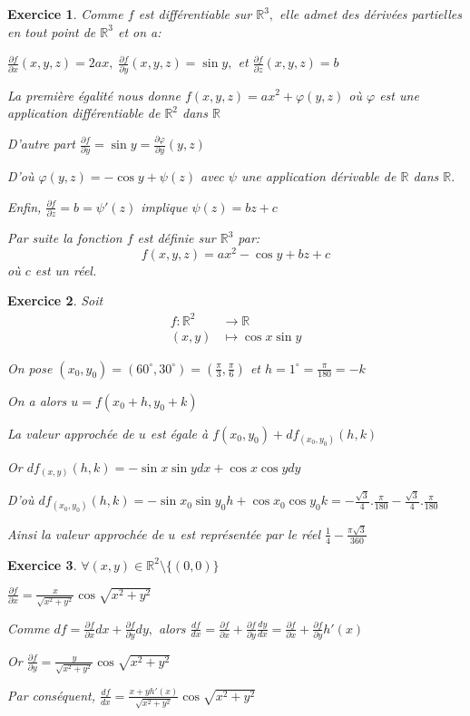 \documentclass[11pt,a4paper]{report}
\newtheorem{exo}{Exercice}[section]
\begin{document}
\begin{exo}
Comme $f$ est différentiable sur $\mathbb{R}^3,$ elle admet des dérivées partielles en tout point de $\mathbb{R}^3$ et on a:

$\frac{\partial f}{\partial x}(x,y,z)=2ax,\;\frac{\partial f}{\partial y}(x,y,z)=\sin y,$ et $\frac{\partial f}{\partial z}(x,y,z)=b$

La première égalité nous donne $f(x,y,z)=ax^2+\varphi(y,z)$ où $\varphi$ est une application différentiable de $\mathbb{R}^2$ dans $\mathbb{R}$

D'autre part $\frac{\partial f}{\partial y}=\sin y=\frac{\partial \varphi}{\partial y}(y,z)$

D'où $\varphi(y,z)=-\cos y+\psi(z)$ avec $\psi$ une application dérivable de $\mathbb{R}$ dans $\mathbb{R}.$

Enfin, $\frac{\partial f}{\partial z}=b=\psi'(z)$ implique $\psi(z)=bz+c$

Par suite la fonction $f$ est définie sur $\mathbb{R}^3$ par:
$$f(x,y,z)=ax^2-\cos y+bz+c$$ où $c$ est un réel.
\end{exo}
\begin{exo}
Soit
\begin{align*}
f:\mathbb{R}^2 &\rightarrow \mathbb{R}\\
(x,y)&\mapsto \cos x\sin y
\end{align*}

On pose $(x_0,y_0)=(60^{\circ},30^{\circ})=(\frac{\pi}{3},\frac{\pi}{6})$ et $h=1^{\circ}=\frac{\pi}{180}=-k$

On a alors $u=f(x_0+h,y_0+k)$

La valeur approchée de $u$ est égale à $f(x_0,y_0)+df_{(x_0,y_0)}(h,k)$

Or $df_{(x,y)}(h,k)=-\sin x\sin y dx+\cos x\cos y dy$

D'où $df_{(x_0,y_0)}(h,k)=-\sin x_0\sin y_0 h+\cos x_0\cos y_0 k=-\frac{\sqrt{3}}{4}.\frac{\pi}{180}-\frac{\sqrt{3}}{4}.\frac{\pi}{180}$

Ainsi la valeur approchée de $u$ est représentée par le réel $\frac{1}{4}-\frac{\pi\sqrt{3}}{360}$
\end{exo}
\begin{exo}
$\forall(x,y)\in\mathbb{R}^2\setminus\{(0,0)\}$

$\frac{\partial f}{\partial x}=\frac{x}{\sqrt{x^2+y^2}}\cos\sqrt{x^2+y^2}$

Comme $df=\frac{\partial f}{\partial x}dx+\frac{\partial f}{\partial y}dy,$ alors $\frac{df}{dx}=\frac{\partial f}{\partial x}+\frac{\partial f}{\partial y}\frac{dy}{dx}=\frac{\partial f}{\partial x}+\frac{\partial f}{\partial y}h'(x)$

Or $\frac{\partial f}{\partial y}=\frac{y}{\sqrt{x^2+y^2}}\cos\sqrt{x^2+y^2}$

Par conséquent, $\frac{df}{dx}=\frac{x+yh'(x)}{\sqrt{x^2+y^2}}\cos\sqrt{x^2+y^2}$
\end{exo}
\end{document}
